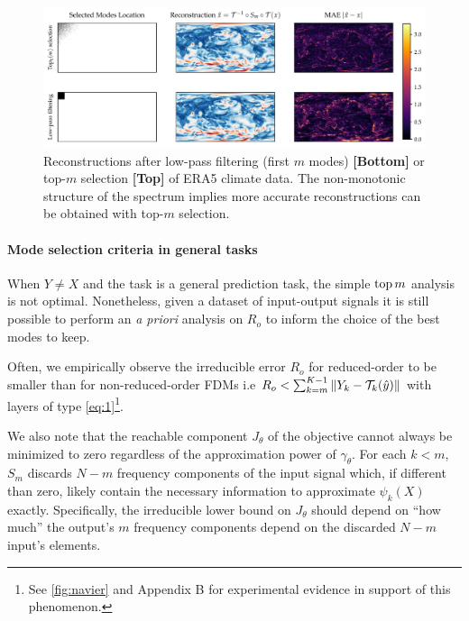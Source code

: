 \begin{figure}[b]
    \centering
    \includegraphics[width=\linewidth]{figures/era5.pdf}
    \vspace{-5.5mm}
    \caption{Reconstructions after low-pass filtering (first $m$ modes) \textbf{[Bottom]} or top-$m$ selection \textbf{[Top]} of ERA5 \citep{hersbach2020era5} climate data. The non-monotonic structure of the spectrum implies more accurate reconstructions can be obtained with top-$m$ selection.}
    \vspace{-5mm}
    \label{fig:era5}
\end{figure}

\paragraph{Mode selection criteria in general tasks} When $Y\neq X$ and the task is a general prediction task, the simple $\operatorname*{top}{m}$ analysis is not optimal. Nonetheless, given a dataset of input-output signals it is still possible to perform an \textit{a priori} analysis on $R_o$ to inform the choice of the best modes to keep. 

Often, we empirically observe the irreducible error $R_o$ for reduced-order \ourmethod{} to be smaller than for non-reduced-order FDMs i.e $R_o <\sum_{k=m}^{K-1}\|Y_k - \mathcal{T}_k(\hat y)\|$ with layers of type \eqref{eq:1}\footnote{See \cref{fig:navier} and Appendix B for experimental evidence in support of this phenomenon.}.

We also note that the reachable component $J_\theta$ of the objective cannot always be minimized to zero regardless of the approximation power of $\gamma_{\theta}$. For each $k<m$, $S_m$ discards $N-m$ frequency components of the input signal which, if different than zero, likely contain the necessary information to approximate $\psi_k(X)$ exactly. Specifically, the irreducible lower bound on $J_\theta$ should depend on ``how much'' the output's $m$ frequency components depend on the discarded $N - m$ input's elements. 

